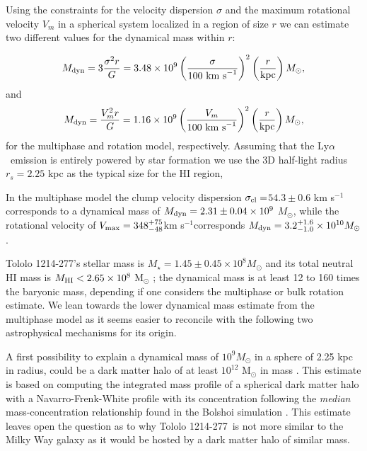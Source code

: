 \documentclass[a4,useAMS,usenatbib,usegraphicx]{mn2e}
\newcommand{\tol}{Tololo 1214-277}
\newcommand{\lya}{Ly$\alpha$}
\newcommand{\kms}{km s$^{-1}$}
\newcommand{\sigmaclump}{$54.3\pm 0.6$ km s$^{-1}$}
\begin{document}
Using the constraints for the velocity dispersion $\sigma$ and the
maximum rotational velocity $V_m$ in a spherical system localized in a
region of size $r$ we can estimate two different values for the
dynamical mass within $r$: 

\begin{equation}
M_{\rm dyn} = 3 \frac{\sigma ^{2}r}{G} = 3.48\times10^{9}
\left(\frac{\sigma}{100\ \mathrm{km\ s}^{-1}}\right)^2\left(\frac{r}{\mathrm{kpc}}\right)
M_{\odot}, 
\end{equation}
%
and
%
\begin{equation}
M_{\rm dyn} = \frac{V_m ^{2}r}{G} = 1.16\times10^{9}
\left(\frac{V_m}{100\ \mathrm{km\ s}^{-1}}\right)^2\left(\frac{r}{\mathrm{kpc}}\right)M_{\odot}, 
\end{equation}
%
for the multiphase and rotation model, respectively.
Assuming that the \lya\ emission is entirely powered by star formation 
we use the 3D half-light radius $r_s=2.25$ kpc as the typical size
for the HI region,


In the multiphase model the clump velocity dispersion
$\sigma_{\rm{cl}}=$\sigmaclump corresponds to a dynamical mass of
$M_{\rm dyn}=2.31\pm0.04 \times 10^{9}$ $M_{\odot}$, while the
rotational velocity of $V_{\rm max}=348^{+75}_{-48}$\kms corresponds
$M_{\rm dyn} = 3.2_{-1.0}^{+1.6}\times 10^{10} M_{\odot}$.


\tol's stellar mass is  $M_{\star} = 1.45\pm0.45\times 10^{8}
M_{\odot}$   \citep{2014PASP..126.1079M} and its total neutral HI mass
is $M_{\rm HI}<2.65\times 10^{8}$ M$_{\odot}$ 
\citep{pustilnikmartin07}; the dynamical mass is at least 12 to 160 times
the baryonic mass, depending if one considers the multiphase or
bulk rotation estimate. 
We lean towards the lower dynamical mass estimate from the multiphase
model as it seems easier to reconcile with the following two
astrophysical mechanisms for its origin.

A first possibility to explain a dynamical mass of $10^{9} M_{\odot}$
in a sphere of 2.25 kpc in radius, could be a dark matter halo of at
least $10^{12}$ M$_{\odot}$ in mass \citep{2011ApJ...726..108T}.
This estimate is based on computing the integrated mass profile of a
spherical dark matter halo with a Navarro-Frenk-White profile with its
concentration following the \emph{median} mass-concentration
relationship found in the Bolshoi simulation
\citep{2012MNRAS.423.3018P}. 
This estimate leaves open the question as to why  \tol\ is not more
similar to the Milky Way galaxy as it would be hosted by a dark matter
halo of similar mass.
\end{document}
